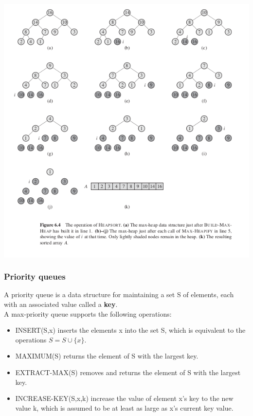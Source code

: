 \documentclass[11pt]{article}
\begin{document}
\includegraphics[width=.9\linewidth]{pics/c6_heapsort_fig.png} \\

\subsubsection{Priority queues}
\label{sec-3-1-6}
A priority queue is a data structure for maintaining a set S of elements, each with an associated value called a \textbf{key}. \\

A max-priority queue supports the following operations: \\
\begin{itemize}
\item INSERT(S,x) inserts the elements x into the set S, which is equivalent to the operations $S=S\cup \{x\}$. \\
\item MAXIMUM(S) returns the element of S with the largest key. \\
\item EXTRACT-MAX(S) removes and returns the element of S with the largest key. \\
\item INCREASE-KEY(S,x,k) increase the value of element x's key to the new value k, which is assumed to be at least as large as x's current key value. \\
\end{itemize}
\end{document}
